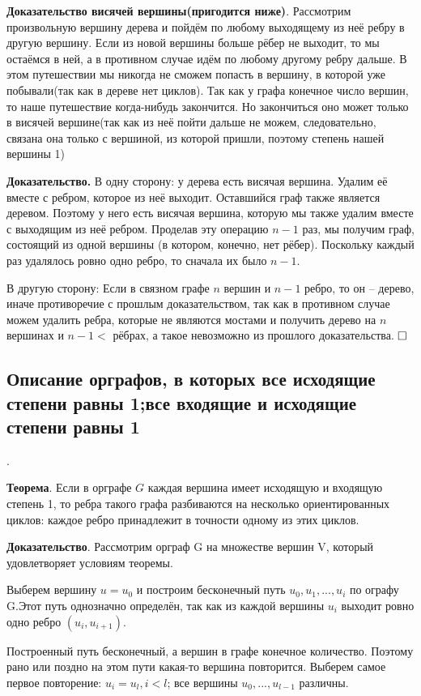 \documentclass[a4paper, 10pt]{article}
\begin{document}
\textbf{Доказательство висячей вершины(пригодится ниже)}.
Рассмотрим произвольную вершину дерева и пойдём по любому выходящему из неё ребру в другую вершину. Если из новой вершины больше рёбер не выходит, то мы остаёмся в ней, а в противном случае идём по любому другому ребру дальше. В этом путешествии мы никогда не сможем попасть в вершину, в которой уже побывали(так как в дереве нет циклов). Так как у графа конечное число вершин, то наше путешествие когда-нибудь закончится. Но закончиться оно может только в висячей вершине(так как из неё пойти дальше не можем, следовательно, связана она только с вершиной, из которой пришли, поэтому степень нашей вершины 1)

\textbf{Доказательство.}
В одну сторону: у дерева есть висячая вершина. Удалим её вместе с ребром, которое из неё выходит. Оставшийся граф также является деревом. Поэтому у него есть висячая вершина, которую мы также удалим вместе с выходящим из неё ребром. Проделав эту операцию  $n - 1$  раз, мы получим граф, состоящий из одной вершины (в котором, конечно, нет рёбер). Поскольку каждый раз удалялось ровно одно ребро, то сначала их было  $n - 1$.

В другую сторону: Если в связном графе $n$ вершин и  $n - 1$  ребро, то он – дерево, иначе противоречие с прошлым доказательством, так как в противном случае можем удалить ребра, которые не являются мостами и получить дерево на $n$ вершинах и $n - 1 <$ рёбрах, а такое невозможно из прошлого доказательства. $\hfill \square$


\subsection{Описание орграфов, в которых все исходящие степени равны 1;все входящие и исходящие степени равны 1}.

\textbf{Теорема}. Если в орграфе $G$ каждая вершина имеет исходящую и входящую степень 1, то ребра такого графа разбиваются на несколько ориентированных циклов: каждое ребро принадлежит в точности одному из этих циклов.

\textbf{Доказательство}. Рассмотрим орграф G на множестве вершин V, который удовлетворяет условиям теоремы.

Выберем вершину $u = u_0$ и построим бесконечный путь $u_0, u_1, ..., u_i$ по ографу G.Этот путь однозначно определён, так как из каждой вершины $u_i$ выходит ровно одно ребро $(u_i, u_{i + 1})$.

Построенный путь бесконечный, а вершин в графе конечное количество. Поэтому рано или поздно на этом пути какая-то вершина повторится. Выберем самое первое повторение: $u_i = u_l, i < l$; все вершины $u_0, ..., u_{l - 1}$ различны.
\end{document}
